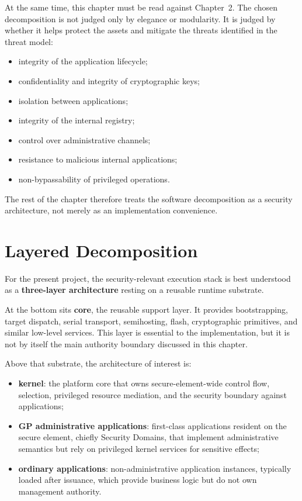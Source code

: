 At the same time, this chapter must be read against Chapter~2. The
chosen decomposition is not judged only by elegance or modularity. It is
judged by whether it helps protect the assets and mitigate the threats
identified in the threat model:
\begin{itemize}
\item integrity of the application lifecycle;
\item confidentiality and integrity of cryptographic keys;
\item isolation between applications;
\item integrity of the internal registry;
\item control over administrative channels;
\item resistance to malicious internal applications;
\item non-bypassability of privileged operations.
\end{itemize}

The rest of the chapter therefore treats the software decomposition as a
security architecture, not merely as an implementation convenience.

\section{Layered Decomposition}
\label{sec:system-layering}


For the present project, the security-relevant execution stack is best
understood as a \textbf{three-layer architecture} resting on a reusable
runtime substrate.

At the bottom sits \textbf{core}, the reusable support layer. It
provides bootstrapping, target dispatch, serial transport, semihosting,
flash, cryptographic primitives, and similar low-level services. This
layer is essential to the implementation, but it is not by itself the
main authority boundary discussed in this chapter.

Above that substrate, the architecture of interest is:

\begin{itemize}
\item \textbf{kernel}: the platform core that owns secure-element-wide control
  flow, selection, privileged resource mediation, and the security
  boundary against applications;
\item \textbf{GP administrative applications}: first-class applications
  resident on the secure element, chiefly Security Domains, that implement administrative
  semantics but rely on privileged kernel services for sensitive effects;
\item \textbf{ordinary applications}: non-administrative application
  instances, typically loaded after issuance, which provide business
  logic but do not own management authority.
\end{itemize}

